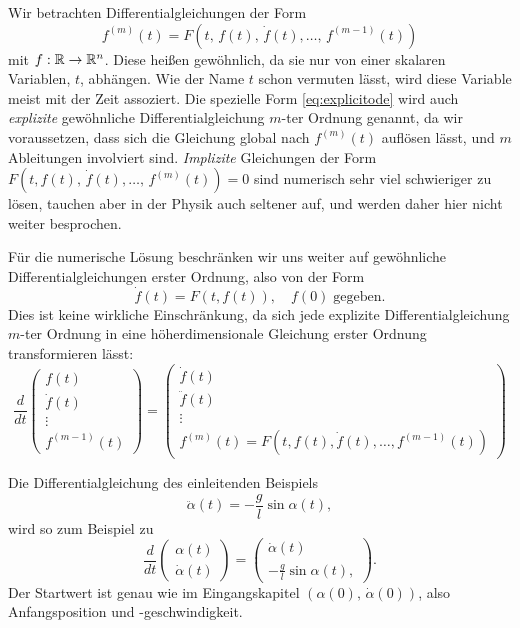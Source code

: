 Wir betrachten Differentialgleichungen der Form
\begin{equation}
  \label{eq:explicitode}
  f^{(m)}(t) = F(t,\, f(t),\, \dot f(t), \ldots,\, f^{(m-1)}(t))
\end{equation}
mit $f:\mathbb{R}\to\mathbb{R}^n$. Diese heißen gewöhnlich, da sie nur von einer
skalaren Variablen, $t$, abhängen. Wie der Name $t$ schon vermuten
lässt, wird diese Variable meist mit der Zeit assoziert. Die spezielle
Form \eqref{eq:explicitode} wird auch \emph{explizite} gewöhnliche
Differentialgleichung $m$-ter Ordnung genannt, da wir voraussetzen,
dass sich die Gleichung global nach $f^{(m)}(t)$ auflösen lässt, und
$m$ Ableitungen involviert sind. \emph{Implizite} Gleichungen der Form
$F(t, f(t),\,\dot f(t), \ldots,\,f^{(m)}(t)) = 0$ sind
numerisch sehr viel schwieriger zu lösen, tauchen aber in der Physik
auch seltener auf, und werden daher hier nicht weiter besprochen.

Für die numerische Lösung beschränken wir uns weiter auf gewöhnliche
Differentialgleichungen erster Ordnung, also von der Form
\begin{equation}
  \label{eq:1storderode}
  \dot f(t) = F(t, f(t)),\quad f(0)\;\text{gegeben}.
\end{equation}
Dies ist keine wirkliche Einschränkung, da sich jede explizite
Differentialgleichung $m$-ter Ordnung in eine höherdimensionale
Gleichung erster Ordnung transformieren lässt:
\begin{equation}
  \frac{d}{dt}\begin{pmatrix}
    f(t)\\
    \dot f(t)\\
    \vdots\\
    f^{(m-1)}(t)
  \end{pmatrix}
  =
  \begin{pmatrix}
    \dot f(t)\\
    \ddot f(t)\\
    \vdots\\
    f^{(m)}(t) = F(t, f(t), \dot f(t), \ldots, f^{(m-1)}(t))
  \end{pmatrix}
\end{equation}

Die Differentialgleichung des einleitenden Beispiels
\begin{equation}
  \label{eq:fadenpendel2}
  \ddot \alpha(t) = -\frac{g}{l}\sin \alpha(t),
\end{equation}
wird so zum Beispiel zu
\begin{equation}
  \frac{d}{dt}\begin{pmatrix}
    \alpha(t)\\
    \dot \alpha(t)
  \end{pmatrix}
  =
  \begin{pmatrix}
    \dot \alpha(t)\\
    -\frac{g}{l}\sin \alpha(t),
  \end{pmatrix}.
\end{equation}  
Der Startwert ist genau wie im Eingangskapitel $(\alpha(0),\, \dot
\alpha(0))$, also Anfangsposition und -geschwindigkeit.

